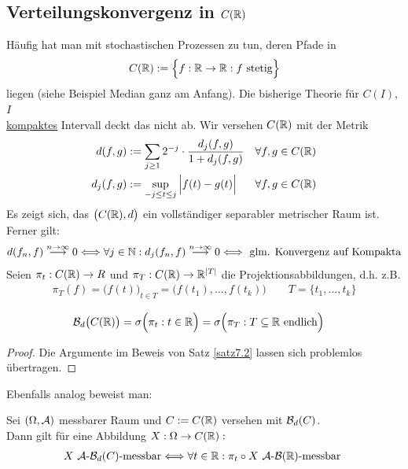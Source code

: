 \subsection{Verteilungskonvergenz in \texorpdfstring{$C(\mathbb{R})$}{C(R)}}
Häufig hat man mit stochastischen Prozessen zu tun, deren Pfade in
\begin{align*}
	C(\mathbb{R}):=\Big\lbrace f:\mathbb{R}\to\mathbb{R}:f\text{ stetig}\Big\rbrace
\end{align*}
liegen (siehe Beispiel Median ganz am Anfang). Die bisherige Theorie für $C(I)$, $I$\\ \underline{kompaktes} Intervall deckt das nicht ab. Wir versehen $C(\mathbb{R})$ mit der Metrik
\begin{align*}
	d(f,g)&:=\sum\limits_{j\geq 1} 2^{-j}\cdot\frac{d_j(f,g)}{1+d_j(f,g)} &\forall f,g\in C(\mathbb{R})\\
	d_j(f,g)&:=\sup\limits_{-j\leq t\leq j}\Big|f(t)-g(t)\Big| &\forall f,g\in C(\mathbb{R})
\end{align*}
Es zeigt sich, das $\big(C(\mathbb{R}),d\big)$ ein vollständiger separabler metrischer Raum ist. Ferner gilt:
\begin{align*}
	d(f_n,f)\stackrel{n\to\infty}{\longrightarrow}0
	\Longleftrightarrow \forall j\in\mathbb{N}: d_j(f_n,f)\stackrel{n\to\infty}{\longrightarrow}0
	\Longleftrightarrow\text{ glm. Konvergenz auf Kompakta}
\end{align*}
Seien $\pi_t:C(\mathbb{R})\to R$ und $\pi_T:C(\mathbb{R})\to\mathbb{R}^{|T|}$ die Projektionsabbildungen, d.h. z.B.
\begin{align*}
	\pi_T(f)=\big(f(t)\big)_{t\in T}=\Big(f(t_1),\ldots,f(t_k)\Big)\qquad
	T=\lbrace t_1,\ldots, t_k\rbrace
\end{align*}

\begin{theorem}\label{theorem7.20}
	\begin{align*}
		\mathcal{B}_d\big(C(\mathbb{R})\big)&=\sigma\Big(\pi_t:t\in\mathbb{R}\Big)=\sigma\Big(\pi_T:T\subseteq\mathbb{R}\text{ endlich}\Big)
	\end{align*}
\end{theorem}

\begin{proof}
	Die Argumente im Beweis von Satz \ref{satz7.2} lassen sich problemlos übertragen.
\end{proof}

Ebenfalls analog beweist man:

\begin{satz}\label{satz7.21}
	 Sei $(\Omega,\mathcal{A})$ messbarer Raum und $C:=C(\mathbb{R})$ versehen mit $\mathcal{B}_d(C)$.\\
	 Dann gilt für eine Abbildung $X:\Omega\to C(\mathbb{R}):$
	 \begin{align*}
	 	X~\mathcal{A}\text{-}\mathcal{B}_d(C)\text{-messbar}
	 	\Longleftrightarrow\forall t\in\mathbb{R}:
	 	\pi_t\circ X~\mathcal{A}\text{-}\mathcal{B}(\mathbb{R})\text{-messbar }
	 \end{align*}
\end{satz}

